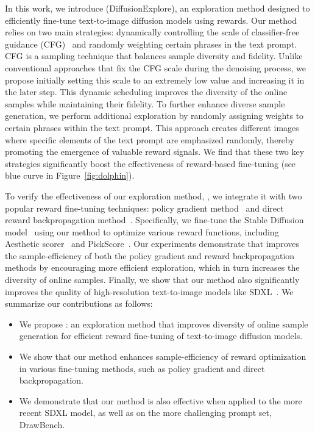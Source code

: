 In this work, we introduce \metabbr (DiffusionExplore), an exploration method designed to efficiently fine-tune text-to-image diffusion models using rewards.
Our method relies on two main strategies: dynamically controlling the scale of classifier-free guidance (CFG)~\cite{cfg} and randomly weighting certain phrases in the text prompt.
CFG is a sampling technique that balances sample diversity and fidelity.
Unlike conventional approaches that fix the CFG scale during the denoising process, we propose initially setting this scale to an extremely low value and increasing it in the later step.
This dynamic scheduling improves the diversity of the online samples while maintaining their fidelity.
To further enhance diverse sample generation, we perform additional exploration by randomly assigning weights to certain phrases within the text prompt. 
This approach creates different images where specific elements of the text prompt are emphasized randomly, thereby promoting the emergence of valuable reward signals. 
We find that these two key strategies significantly boost the effectiveness of reward-based fine-tuning (see blue curve in Figure~\ref{fig:dolphin}).

To verify the effectiveness of our exploration method, \metabbr, we integrate it with two popular reward fine-tuning techniques: policy gradient method~\cite{ddpo} and direct reward backpropagation method~\cite{alignprop}.
Specifically, we fine-tune the Stable Diffusion model~\cite{stable_diffusion} using our method to optimize various reward functions, including Aesthetic scorer~\cite{aesthetic} and PickScore~\cite{pickscore}. 
Our experiments demonstrate that \metabbr improves the sample-efficiency of both the policy gradient and reward backpropagation methods by encouraging more efficient exploration, which in turn increases the diversity of online samples.
Finally, we show that our method also significantly improves the quality of high-resolution text-to-image models like SDXL~\cite{sdxl}. We summarize our contributions as follows:

\begin{itemize}
    \item We propose \metabbr: an exploration method that improves diversity of online sample generation for efficient reward fine-tuning of text-to-image diffusion models.
    \item We show that our method enhances sample-efficiency of reward optimization in various fine-tuning methods, such as policy gradient and direct backpropagation.
    \item We demonstrate that our method is also effective when applied to the more recent SDXL model, as well as on the more challenging prompt set, DrawBench.
\end{itemize}

